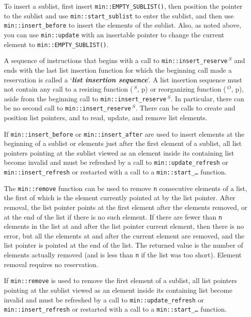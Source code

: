 \documentclass[12pt]{article}
\newcommand{\key}[1]{{\bf \em #1}\index{#1}}
\newcommand{\pagref}[1]{p\pageref{#1}}
\newcommand{\EOL}{\penalty \exhyphenpenalty}
\newcommand{\RESIZE}{$\,^S$}
\newcommand{\REORG}{$\,^O$}
\begin{document}
To insert a sublist, first insert {\tt min::\EOL EMPTY\_SUBLIST()}, then
position the pointer to the sublist and use
{\tt min::\EOL start\_sublist} to enter the sublist, and then use
{\tt min::\EOL insert\_before} to insert the elements of the sublist.
Also, as noted above, you can use {\tt min::\EOL update} with an
insertable pointer to change
the current element to {\tt min::\EOL EMPTY\_\EOL SUBLIST()}.

A sequence of instructions that begins with a
call to {\tt min::\EOL insert\_reserve\RESIZE} and ends with the last
list insertion function for which the beginning call made a reservation
is called a `\key{list insertion sequence}'.  A list insertion sequence
must not contain any call to a resizing function
(\RESIZE, \pagref{RESIZING-FUNCTIONS}) or reorganizing function
(\REORG, \pagref{REORGANIZING-FUNCTIONS}), aside from
the beginning call to {\tt min::\EOL insert\_reserve\RESIZE}.
In particular, there can be no
second call to {\tt min::\EOL insert\_reserve\RESIZE}.  There can be calls to
create and position list pointers, and to read, update, and remove
list elements.

If {\tt min::\EOL insert\_\EOL before}
or {\tt min::\EOL insert\_\EOL after}
are used to insert elements at the beginning of a sublist or elements
just after the first element of a sublist,
all list pointers pointing at the sublist viewed as an element
inside its containing list
become invalid and must be refreshed by
a call to {\tt min::\EOL update\_\EOL refresh} or
{\tt min::\EOL insert\_\EOL refresh} or restarted with a call to a
{\tt min::\EOL start\_\ldots} function.

The {\tt min::\EOL remove} function can be used to remove
{\tt n} consecutive elements
of a list, the first of which is the element currently pointed at by
the list pointer.
After removal, the list pointer points at the first element after the
elements removed, or at the end of the list if there is no such element.
If there are fewer than {\tt n} elements in the list at and after
the list pointer current element, then there is no error, but all the
elements at and after the current element are removed, and the list
pointer is pointed at the end of the list.  The returned value is the
number of elements actually removed (and is less than {\tt n} if the
list was too short).  Element removal requires no reservation.

If {\tt min::\EOL remove} is used to remove the first element of
a sublist,
all list pointers pointing at the sublist viewed as an element
inside its containing list
become invalid and must be refreshed by
a call to {\tt min::\EOL update\_\EOL refresh} or
{\tt min::\EOL insert\_\EOL refresh} or restarted with a call to a
{\tt min::\EOL start\_\ldots} function.
\end{document}
